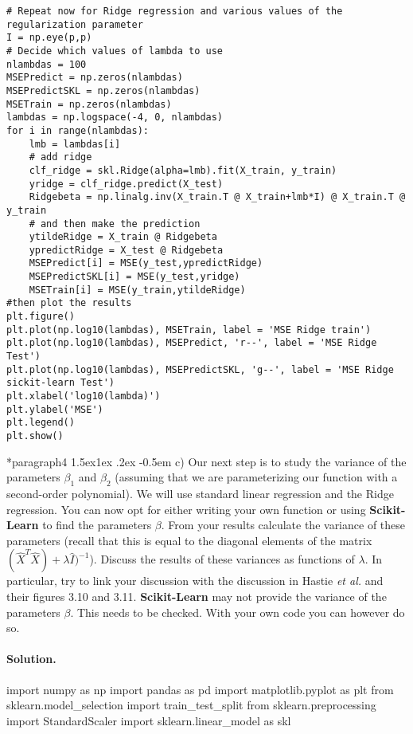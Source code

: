 \documentclass[%
oneside,                 %
final,                   %
10pt]{article}
\makeatletter
\newenvironment{doconceexercise}{}{}
\newcommand\subex{\@startsection*{paragraph}{4}{\z@}%
                  {1.5ex\@plus1ex \@minus.2ex}%
                  {-0.5em}%
                  {\normalfont\normalsize\bfseries}}
\makeatother
\begin{document}
\begin{doconceexercise}
\begin{verbatim}
# Repeat now for Ridge regression and various values of the regularization parameter
I = np.eye(p,p)
# Decide which values of lambda to use
nlambdas = 100
MSEPredict = np.zeros(nlambdas)
MSEPredictSKL = np.zeros(nlambdas)
MSETrain = np.zeros(nlambdas)
lambdas = np.logspace(-4, 0, nlambdas)
for i in range(nlambdas):
    lmb = lambdas[i]
    # add ridge
    clf_ridge = skl.Ridge(alpha=lmb).fit(X_train, y_train)
    yridge = clf_ridge.predict(X_test)
    Ridgebeta = np.linalg.inv(X_train.T @ X_train+lmb*I) @ X_train.T @ y_train
    # and then make the prediction
    ytildeRidge = X_train @ Ridgebeta
    ypredictRidge = X_test @ Ridgebeta
    MSEPredict[i] = MSE(y_test,ypredictRidge)
    MSEPredictSKL[i] = MSE(y_test,yridge)
    MSETrain[i] = MSE(y_train,ytildeRidge)
#then plot the results
plt.figure()
plt.plot(np.log10(lambdas), MSETrain, label = 'MSE Ridge train')
plt.plot(np.log10(lambdas), MSEPredict, 'r--', label = 'MSE Ridge Test')
plt.plot(np.log10(lambdas), MSEPredictSKL, 'g--', label = 'MSE Ridge sickit-learn Test')
plt.xlabel('log10(lambda)')
plt.ylabel('MSE')
plt.legend()
plt.show()
\end{verbatim}


\subex{c)}
Our next step is to study the variance of the parameters $\beta_1$ and $\beta_2$ (assuming that we are parameterizing our function with a second-order polynomial). We will use standard linear regression and the Ridge regression.  You can now opt for either writing your own function or using \textbf{Scikit-Learn} to find the parameters $\beta$. From your results calculate the variance of these parameters (recall that this is equal to the diagonal elements of the matrix $(\hat{X}^T\hat{X})+\lambda\hat{I})^{-1}$). Discuss the results of these variances as functions of $\lambda$. In particular, try to link your discussion with the discussion in Hastie \emph{et al.} and their figures 3.10 and  3.11. \textbf{Scikit-Learn} may not provide the variance of the parameters $\beta$. This needs to be checked. With your own code you can however do so.


\paragraph{Solution.}
import numpy as np
import pandas as pd
import matplotlib.pyplot as plt
from sklearn.model_selection import train_test_split
from sklearn.preprocessing import StandardScaler
import sklearn.linear_model as skl


\end{doconceexercise}
\end{document}
